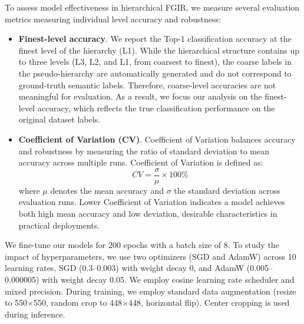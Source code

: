 \documentclass[10pt,twocolumn,letterpaper]{article}
\begin{document}
To assess model effectiveness in hierarchical FGIR, we measure several evaluation metrics measuring individual level accuracy and robustness:
\begin{itemize}

    \item \textbf{Finest-level accuracy}. We report the Top-1 classification accuracy at the finest level of the hierarchy (L1). While the hierarchical structure contains up to three levels (L3, L2, and L1, from coarsest to finest), the coarse labels in the pseudo-hierarchy are automatically generated and do not correspond to ground-truth semantic labels. Therefore, coarse-level accuracies are not meaningful for evaluation. As a result, we focus our analysis on the finest-level accuracy, which reflects the true classification performance on the original dataset labels.

    
    \item \textbf{Coefficient of Variation (CV)}. 
    Coefficient of Variation \cite{brown_applied_1998} balances accuracy and robustness by measuring the ratio of standard deviation to mean accuracy across multiple runs.
    Coefficient of Variation is defined as:
    \[
    CV = \frac{\sigma}{\mu} \times 100\% 
    \]
    where $\mu$ denotes the mean accuracy and $\sigma$ the standard deviation across evaluation runs. Lower Coefficient of Variation indicates a model achieves both high mean accuracy and low deviation, desirable characteristics in practical deployments. 
\end{itemize}

We fine-tune our models for 200 epochs with a batch size of 8. To study the impact of hyperparameters, we use two optimizers (SGD and AdamW) across 10 learning rates, SGD (0.3–0.003) with weight decay 0, and AdamW (0.005–0.000005) with weight decay 0.05. We employ cosine learning rate scheduler and mixed precision. During training, we employ standard data augmentation (resize to 550×550, random crop to 448×448, horizontal flip). Center cropping is used during inference.
\end{document}
